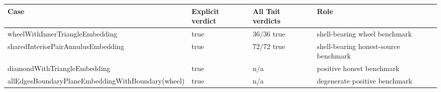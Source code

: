 \begin{tabular}{llll}
\toprule
Case & Explicit verdict & All Tait verdicts & Role \\
\midrule
wheelWithInnerTriangleEmbedding & true & 36/36 true & shell-bearing wheel benchmark \\
sharedInteriorPairAnnulusEmbedding & true & 72/72 true & shell-bearing honest-source benchmark \\
diamondWithTriangleEmbedding & true & n/a & positive honest benchmark \\
allEdgesBoundaryPlaneEmbeddingWithBoundary(wheel) & true & n/a & degenerate positive benchmark \\
\bottomrule
\end{tabular}
